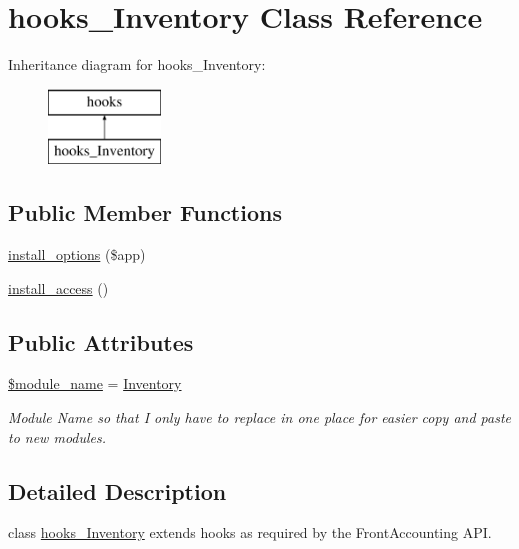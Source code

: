 \hypertarget{classhooks___inventory}{}\section{hooks\+\_\+\+Inventory Class Reference}
\label{classhooks___inventory}
Inheritance diagram for hooks\+\_\+\+Inventory\+:\begin{figure}[H]
\begin{center}
\leavevmode
\includegraphics[height=2.000000cm]{dd/d41/classhooks___inventory}
\end{center}
\end{figure}
\subsection*{Public Member Functions}
\begin{DoxyCompactItemize}
\item 
\hyperlink{classhooks___inventory_a92994ac980fa7a6e8256e12c999cde84}{install\+\_\+options} (\$app)
\item 
\hyperlink{classhooks___inventory_ab5c9c0ba2bcb53683571ff27ab5000dd}{install\+\_\+access} ()
\end{DoxyCompactItemize}
\subsection*{Public Attributes}
\begin{DoxyCompactItemize}
\item 
\hypertarget{classhooks___inventory_a85ac46d599d8926eb60fd90b828dbccd}{}\label{classhooks___inventory_a85ac46d599d8926eb60fd90b828dbccd} 
\hyperlink{classhooks___inventory_a85ac46d599d8926eb60fd90b828dbccd}{\$module\+\_\+name} = \textquotesingle{}\hyperlink{class_inventory}{Inventory}\textquotesingle{}
\begin{DoxyCompactList}\small\item\em Module Name so that I only have to replace in one place for easier copy and paste to new modules. \end{DoxyCompactList}\end{DoxyCompactItemize}


\subsection{Detailed Description}
class \hyperlink{classhooks___inventory}{hooks\+\_\+\+Inventory} extends hooks as required by the Front\+Accounting A\+PI. 

